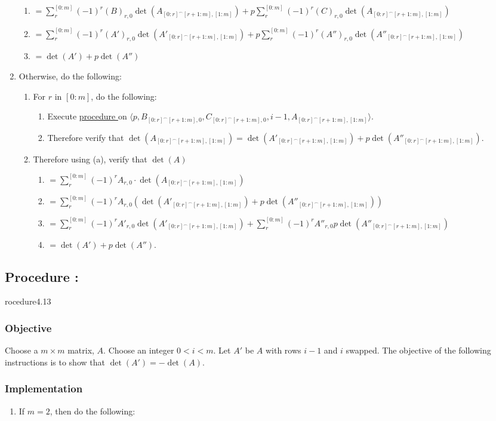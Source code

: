 \documentclass{article}
\newcounter{procedure}[part]
\newcommand{\procedure}[1]{\subsection*{Procedure \thepart:\theprocedure}\label{sec:procedure #1}\global\expandafter\edef\csname procedure#1\endcsname{\thepart:\theprocedure}\addtocounter{procedure}{1}}
\newcommand{\objective}{\subsubsection*{Objective}}
\newcommand{\implementation}{\subsubsection*{Implementation}}
\newcommand{\procedurehr}[1]{\hyperref[sec:procedure #1]{procedure \expandafter\csname procedure#1\endcsname}}
\begin{document}
\begin{multicols}{2}
\begin{enumerate}
\begin{enumerate}
						\item $=\sum_r^{[0:m]} (-1)^{r}(B)_{r,0}\det(A_{[0:r]^\frown[r+1:m],[1:m]})+p\sum_r^{[0:m]} (-1)^{r}(C)_{r,0}\det(A_{[0:r]^\frown[r+1:m],[1:m]})$
						\item $=\sum_r^{[0:m]} (-1)^{r}(A')_{r,0}\det(A'_{[0:r]^\frown[r+1:m],[1:m]})+p\sum_r^{[0:m]} (-1)^{r}(A'')_{r,0}\det(A''_{[0:r]^\frown[r+1:m],[1:m]})$
						\item $=\det(A')+p\det(A'')$
					\end{enumerate}
					\item Otherwise, do the following:
					\begin{enumerate}
						\item For $r$ in $[0:m]$, do the following:
						\begin{enumerate}
							\item Execute \procedurehr{4.12} on $\langle p,B_{[0:r]^\frown[r+1:m],0},C_{[0:r]^\frown[r+1:m],0},i-1,A_{[0:r]^\frown[r+1:m],[1:m]}\rangle$.
							\item Therefore verify that $\det(A_{[0:r]^\frown[r+1:m],[1:m]})=\det(A'_{[0:r]^\frown[r+1:m],[1:m]})+p\det(A''_{[0:r]^\frown[r+1:m],[1:m]})$.
						\end{enumerate}
						\item Therefore using (a), verify that $\det(A)$
						\begin{enumerate}
							\item $=\sum_r^{[0:m]} (-1)^{r}A_{r,0}\cdot\det(A_{[0:r]^\frown[r+1:m],[1:m]})$
							\item $=\sum_r^{[0:m]} (-1)^{r}A_{r,0}(\det(A'_{[0:r]^\frown[r+1:m],[1:m]})+p\det(A''_{[0:r]^\frown[r+1:m],[1:m]}))$
							\item $=\sum_r^{[0:m]} (-1)^{r}A'_{r,0}\det(A'_{[0:r]^\frown[r+1:m],[1:m]})+\sum_r^{[0:m]} (-1)^{r}A''_{r,0}p\det(A''_{[0:r]^\frown[r+1:m],[1:m]})$
							\item $=\det(A')+p\det(A'')$.
						\end{enumerate}
					\end{enumerate}
				\end{enumerate}
		\procedure{4.13}
			\objective
				Choose a $m\times m$ matrix, $A$. Choose an integer $0<i<m$. Let $A'$ be $A$ with rows $i-1$ and $i$ swapped. The objective of the following instructions is to show that $\det(A')=-\det(A)$.
			\implementation
				\begin{enumerate}
					\item If $m=2$, then do the following:
					\begin{enumerate}

\end{enumerate}
\end{enumerate}
\end{multicols}
\end{document}
